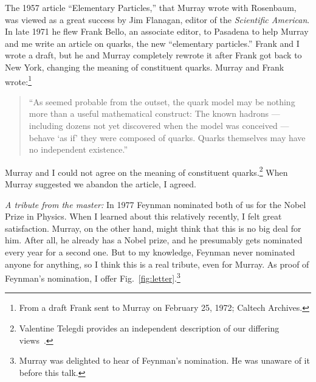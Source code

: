 \documentclass[12pt]{article}
\begin{document}
The 1957 article ``Elementary Particles,'' that Murray wrote with Rosenbaum,  was viewed as a great success by Jim Flanagan, editor of the {\it Scientific American}. In late 1971 he flew Frank Bello, an associate editor, to Pasadena to help Murray and me write an article on quarks, the new ``elementary particles.''  Frank and I wrote a draft, but he and Murray completely rewrote it after Frank got back to New York, changing the meaning of constituent quarks. Murray and Frank wrote:\footnote{From a draft Frank sent to Murray on February 25, 1972; Caltech Archives.}

\begin{quote}
``As seemed probable from the outset, the quark model may be nothing more than a useful mathematical construct: The known hadrons --- including dozens not yet discovered when the model was conceived --- behave `as if' they were composed of quarks. Quarks themselves may have no independent existence.''
\end{quote}
Murray and I could not agree on the meaning of constituent quarks.\footnote{Valentine Telegdi provides an independent description of our differing views~\cite{Telegdi}.} When Murray suggested we abandon the article, I agreed.

{\it A tribute from the master:}
In 1977 Feynman nominated both of us for the Nobel Prize in Physics. When I learned about this relatively recently, I felt great satisfaction. Murray, on the other hand, might think that this is no big deal for him. After all, he already has a Nobel prize, and he presumably gets nominated every year for a second one. But to my knowledge, Feynman never nominated anyone for anything, so I think this is a real tribute, even for Murray. As proof of Feynman's nomination, I offer Fig.~\ref{fig:letter}.\footnote{Murray was delighted to hear of Feynman's nomination. He was unaware of it before this talk.}
\end{document}
